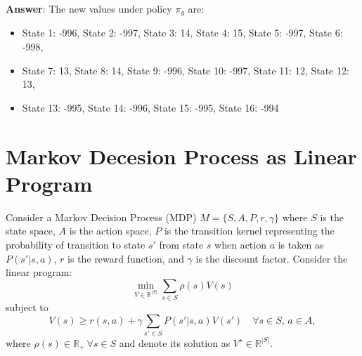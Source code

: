 \documentclass[a3paper,12pt]{extarticle} %
\begin{document}
\begin{enumerate}
    \textbf{Answer}: The new values under policy \( \pi_g \) are:
    \begin{itemize}
        \item State 1: -996, State 2: -997, State 3: 14, State 4: 15, State 5: -997, State 6: -998,
        \item State 7: 13, State 8: 14, State 9: -996, State 10: -997, State 11: 12, State 12: 13,
        \item State 13: -995, State 14: -996, State 15: -995, State 16: -994
    \end{itemize}


\end{enumerate}

\newpage


\newpage
\section{Markov Decesion Process as Linear Program}
Consider a Markov Decision Process (MDP) $M = \{S, A, P, r, \gamma\}$ where $S$ is the state space, $A$ is the action space, $P$ is the transition kernel representing the probability of transition to state $s'$ from state $s$ when action $a$ is taken as $P(s'|s, a)$, $r$ is the reward function, and $\gamma$ is the discount factor. Consider the linear program:
\[
\min_{V \in \mathbb{R}^{|S|}} \sum_{s \in S} \rho(s)V(s)
\]
subject to
\[
V(s) \geq r(s, a) + \gamma \sum_{s' \in S} P(s'|s, a)V(s') \quad \forall s \in S, \, a \in A,
\]
where $\rho(s) \in \mathbb{R}_+ \, \forall s \in S$ and denote its solution as $V^\star \in \mathbb{R}^{|S|}$.
\end{document}
